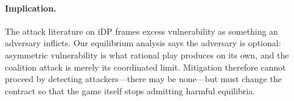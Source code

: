 \paragraph{Implication.} The attack literature on iDP frames excess
vulnerability as something an adversary inflicts. Our equilibrium
analysis says the adversary is optional: asymmetric vulnerability is what
rational play produces on its own, and the coalition attack is merely
its coordinated limit. Mitigation therefore cannot proceed by
detecting attackers---there may be none---but must change the contract
so that the game itself stops admitting harmful equilibria.
